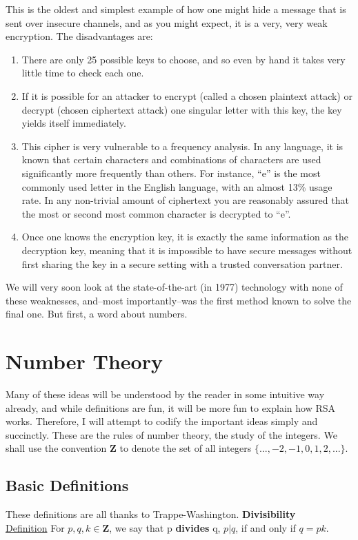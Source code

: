 \documentclass{article}
\begin{document}
        This is the oldest and simplest example of how one might hide a message that is sent over insecure channels, and as you might expect, it is a very, very weak encryption.
        The disadvantages are:
        \begin{enumerate}
            \item
            There are only 25 possible keys to choose, and so even by hand it takes very little time to check each one.
            \item
            If it is possible for an attacker to encrypt (called a chosen plaintext attack) or decrypt (chosen ciphertext attack) one singular letter with this key, the key yields itself immediately.
            \item
            This cipher is very vulnerable to a frequency analysis.  In any language, it is known that certain characters and combinations of characters are used significantly more frequently than others.  For instance, ``e'' is the most commonly used letter in the English language, with an almost 13\% usage rate.  In any non-trivial amount of ciphertext you are reasonably assured that the most or second most common character is decrypted to ``e''.
            \item
            Once one knows the encryption key, it is exactly the same information as the decryption key, meaning that it is impossible to have secure messages without first sharing the key in a secure setting with a trusted conversation partner.  
        \end{enumerate}
        
        We will very soon look at the state-of-the-art (in 1977) technology with none of these weaknesses, and--most importantly--was the first method known to solve the final one.  
        But first, a word about numbers.
        
    \section{Number Theory}
        Many of these ideas will be understood by the reader in some intuitive way already, and while definitions are fun, it will be more fun to explain how RSA works.
        Therefore, I will attempt to codify the important ideas simply and succinctly.  
        These are the rules of number theory, the study of the integers.  We shall use the convention $\mathbf{Z}$ to denote the set of all integers $\{...,-2,-1,0,1,2,...\}$.
        
        \subsection{Basic Definitions}
        These definitions are all thanks to Trappe-Washington.\cite{trappewash}
            \textbf{Divisibility}\\
            \underline{Definition} For $p, q, k \in\mathbf{Z}$, we say that p \textbf{divides} q, $p|q$, if and only if $q=pk$.
            
\end{document}
